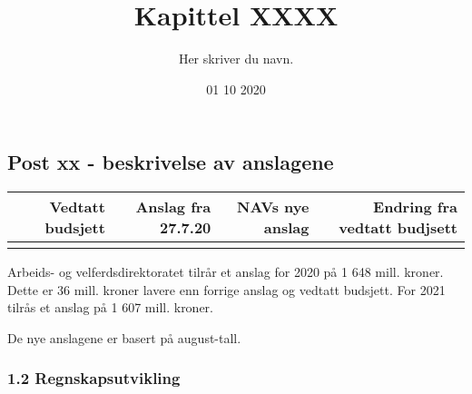 \documentclass[
]{article}
\title{Kapittel XXXX}
\author{Her skriver du navn.}
\date{01 10 2020}
\begin{document}
\maketitle

\hypertarget{post-xx---beskrivelse-av-anslagene}{%
\subsection{Post xx - beskrivelse av
anslagene}\label{post-xx---beskrivelse-av-anslagene}}

\begin{table}[H]
\centering
\begin{tabular}{rrrr}
\toprule
Vedtatt budsjett & Anslag fra 27.7.20 & NAVs nye anslag & Endring fra vedtatt budjsett\\
\midrule
\cellcolor{gray!6}{1684} & \cellcolor{gray!6}{1684} & \cellcolor{gray!6}{1648} & \cellcolor{gray!6}{-36}\\
\bottomrule
\end{tabular}
\end{table}

Arbeids- og velferdsdirektoratet tilrår et anslag for 2020 på 1 648
mill. kroner. Dette er 36 mill. kroner lavere enn forrige anslag og
vedtatt budsjett. For 2021 tilrås et anslag på 1 607 mill. kroner.

De nye anslagene er basert på august-tall.

\hypertarget{regnskapsutvikling}{%
\subsubsection{1.2 Regnskapsutvikling}\label{regnskapsutvikling}}
\end{document}
